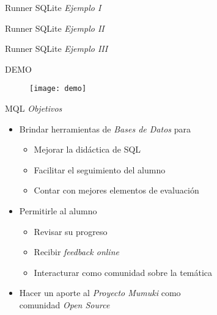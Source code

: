\documentclass{beamer}
\begin{document}
\begin{frame}[fragile]
    {Runner SQLite}
    {\emph{Ejemplo I}}
    
\end{frame}

\begin{frame}[fragile]
    {Runner SQLite}
    {\emph{Ejemplo II}}
    
\end{frame}

\begin{frame}[fragile]
    {Runner SQLite}
    {\emph{Ejemplo III}}
    
\end{frame}


\begin{frame}

    \begin{center}
        \LARGE{DEMO}

        \begin{figure}[h]
            \texttt{[image: demo]}
        \end{figure}
    \end{center}

\end{frame}


\begin{frame}
    {MQL}
    {\emph{Objetivos}}

    \begin{itemize}
        \item Brindar herramientas de \textit{Bases de Datos} para

        \begin{itemize}
            \item Mejorar la didáctica de SQL
            \item Facilitar el seguimiento del alumno
            \item Contar con mejores elementos de evaluación
        \end{itemize}

        \item Permitirle al alumno

        \begin{itemize}
            \item Revisar su progreso
            \item Recibir \emph{feedback online}
            \item Interacturar como comunidad sobre la temática
        \end{itemize}

        \item Hacer un aporte al \textit{Proyecto Mumuki} como \\ comunidad \emph{Open Source}
    \end{itemize}

\end{frame}
\end{document}
